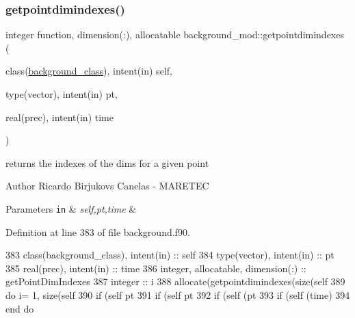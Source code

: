 \subsubsection{\texorpdfstring{getpointdimindexes()}{getpointdimindexes()}}
{\footnotesize\ttfamily integer function, dimension(\+:), allocatable background\+\_\+mod\+::getpointdimindexes (\begin{DoxyParamCaption}\item[{class(\mbox{\hyperlink{structbackground__mod_1_1background__class}{background\+\_\+class}}), intent(in)}]{self,  }\item[{type(vector), intent(in)}]{pt,  }\item[{real(prec), intent(in)}]{time }\end{DoxyParamCaption})\hspace{0.3cm}{\ttfamily [private]}}



returns the indexes of the dims for a given point 

\begin{DoxyAuthor}{Author}
Ricardo Birjukovs Canelas -\/ M\+A\+R\+E\+T\+EC 
\end{DoxyAuthor}

\begin{DoxyParams}[1]{Parameters}
\mbox{\tt in}  & {\em self,pt,time} & \\
\hline
\end{DoxyParams}


Definition at line 383 of file background.\+f90.


\begin{DoxyCode}
383     \textcolor{keywordtype}{class}(background\_class), \textcolor{keywordtype}{intent(in)} :: self
384     \textcolor{keywordtype}{type}(vector), \textcolor{keywordtype}{intent(in)} :: pt
385     \textcolor{keywordtype}{real(prec)}, \textcolor{keywordtype}{intent(in)} :: time
386     \textcolor{keywordtype}{integer}, \textcolor{keywordtype}{allocatable}, \textcolor{keywordtype}{dimension(:)} :: getPointDimIndexes
387     \textcolor{keywordtype}{integer} :: i
388     \textcolor{keyword}{allocate}(getpointdimindexes(\textcolor{keyword}{size}(self%
389     \textcolor{keywordflow}{do} i= 1, \textcolor{keyword}{size}(self%
390         \textcolor{keywordflow}{if} (self%
      pt%
391         \textcolor{keywordflow}{if} (self%
      pt%
392         \textcolor{keywordflow}{if} (self%
      (pt%
393         \textcolor{keywordflow}{if} (self%
      (time)
394 \textcolor{keywordflow}{    end do}
\end{DoxyCode}
\mbox{\label{namespacebackground__mod_a09d61976c4545e8753eb4594044b109d}} 

